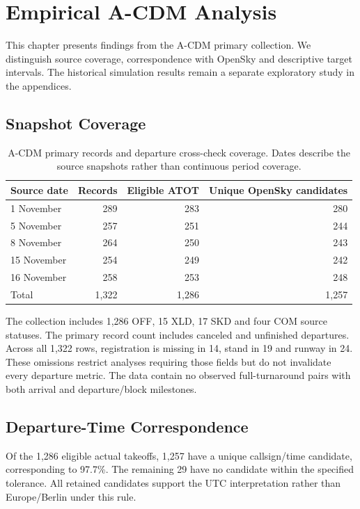 \chapter{Empirical A-CDM Analysis}
\label{ch:results}
This chapter presents findings from the A-CDM primary collection. We distinguish source coverage, correspondence with OpenSky and descriptive target intervals. The historical simulation results remain a separate exploratory study in the appendices.

\section{Snapshot Coverage}
\begin{table}[htbp]\centering\small
\begin{tabular}{lrrr}\hline
Source date & Records & Eligible ATOT & Unique OpenSky candidates\\\hline
1 November & 289 & 283 & 280\\
5 November & 257 & 251 & 244\\
8 November & 264 & 250 & 243\\
15 November & 254 & 249 & 242\\
16 November & 258 & 253 & 248\\\hline
Total & 1,322 & 1,286 & 1,257\\\hline
\end{tabular}
\caption{A-CDM primary records and departure cross-check coverage. Dates describe the source snapshots rather than continuous period coverage.}\label{tab:acdmcoverage}
\end{table}
The collection includes 1,286 OFF, 15 XLD, 17 SKD and four COM source statuses. The primary record count includes canceled and unfinished departures. Across all 1,322 rows, registration is missing in 14, stand in 19 and runway in 24. These omissions restrict analyses requiring those fields but do not invalidate every departure metric. The data contain no observed full-turnaround pairs with both arrival and departure/block milestones.

\section{Departure-Time Correspondence}
Of the 1,286 eligible actual takeoffs, 1,257 have a unique callsign/time candidate, corresponding to 97.7\%. The remaining 29 have no candidate within the specified tolerance. All retained candidates support the UTC interpretation rather than Europe/Berlin under this rule.

